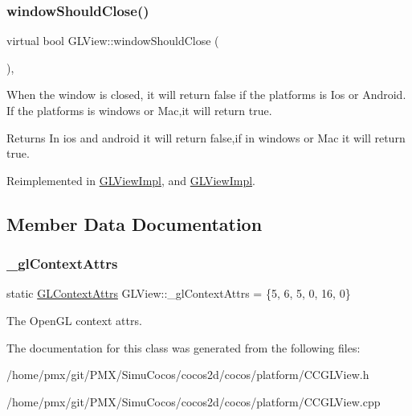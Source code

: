\subsubsection{\texorpdfstring{window\+Should\+Close()}{windowShouldClose()}\hspace{0.1cm}{\footnotesize\ttfamily [2/2]}}
{\footnotesize\ttfamily virtual bool G\+L\+View\+::window\+Should\+Close (\begin{DoxyParamCaption}{ }\end{DoxyParamCaption})\hspace{0.3cm}{\ttfamily [inline]}, {\ttfamily [virtual]}}

When the window is closed, it will return false if the platforms is Ios or Android. If the platforms is windows or Mac,it will return true.

\begin{DoxyReturn}{Returns}
In ios and android it will return false,if in windows or Mac it will return true. 
\end{DoxyReturn}


Reimplemented in \hyperlink{classGLViewImpl_a0d0a12b4bfa3656c9b24ca8b141f7b1e}{G\+L\+View\+Impl}, and \hyperlink{classGLViewImpl_a0d0a12b4bfa3656c9b24ca8b141f7b1e}{G\+L\+View\+Impl}.



\subsection{Member Data Documentation}
\mbox{\label{classGLView_a9d594512212b1e389a373d4d067ec058}} 
\subsubsection{\texorpdfstring{\+\_\+gl\+Context\+Attrs}{\_glContextAttrs}}
{\footnotesize\ttfamily static \hyperlink{structGLContextAttrs}{G\+L\+Context\+Attrs} G\+L\+View\+::\+\_\+gl\+Context\+Attrs = \{5, 6, 5, 0, 16, 0\}\hspace{0.3cm}{\ttfamily [static]}}

The Open\+GL context attrs. 

The documentation for this class was generated from the following files\+:\begin{DoxyCompactItemize}
\item 
/home/pmx/git/\+P\+M\+X/\+Simu\+Cocos/cocos2d/cocos/platform/C\+C\+G\+L\+View.\+h\item 
/home/pmx/git/\+P\+M\+X/\+Simu\+Cocos/cocos2d/cocos/platform/C\+C\+G\+L\+View.\+cpp\end{DoxyCompactItemize}
